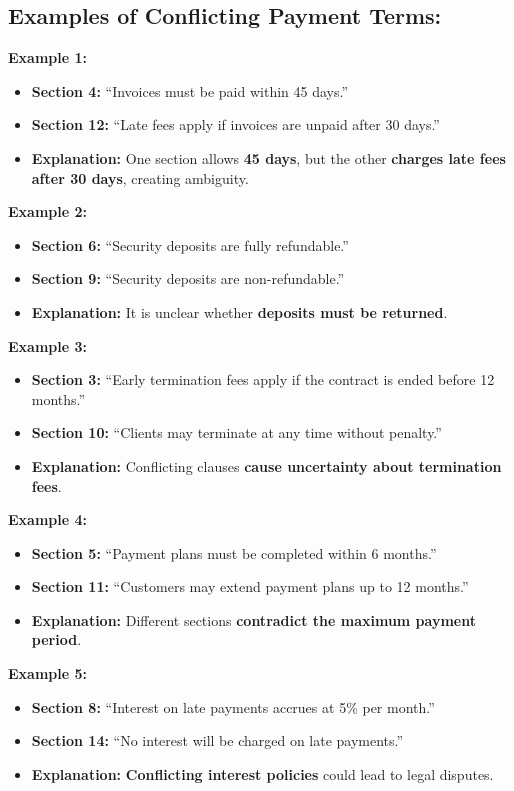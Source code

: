 \documentclass[11pt]{article}
\begin{document}
\begin{tcolorbox}[breakable,colback=lightestgray,colframe=black,title=\textbf{Inconsistency In-Text Data Generation Prompt}]
\subsection*{\textbf{Examples of Conflicting Payment Terms:}}

\textbf{Example 1:}
\begin{itemize}
    \item \textbf{Section 4:} ``Invoices must be paid within 45 days.''
    \item \textbf{Section 12:} ``Late fees apply if invoices are unpaid after 30 days.''
    \item \textbf{Explanation:} One section allows \textbf{45 days}, but the other \textbf{charges late fees after 30 days}, creating ambiguity.
\end{itemize}

\textbf{Example 2:}
\begin{itemize}
    \item \textbf{Section 6:} ``Security deposits are fully refundable.''
    \item \textbf{Section 9:} ``Security deposits are non-refundable.''
    \item \textbf{Explanation:} It is unclear whether \textbf{deposits must be returned}.
\end{itemize}

\textbf{Example 3:}
\begin{itemize}
    \item \textbf{Section 3:} ``Early termination fees apply if the contract is ended before 12 months.''
    \item \textbf{Section 10:} ``Clients may terminate at any time without penalty.''
    \item \textbf{Explanation:} Conflicting clauses \textbf{cause uncertainty about termination fees}.
\end{itemize}

\textbf{Example 4:}
\begin{itemize}
    \item \textbf{Section 5:} ``Payment plans must be completed within 6 months.''
    \item \textbf{Section 11:} ``Customers may extend payment plans up to 12 months.''
    \item \textbf{Explanation:} Different sections \textbf{contradict the maximum payment period}.
\end{itemize}

\textbf{Example 5:}
\begin{itemize}
    \item \textbf{Section 8:} ``Interest on late payments accrues at 5\% per month.''
    \item \textbf{Section 14:} ``No interest will be charged on late payments.''
    \item \textbf{Explanation:} \textbf{Conflicting interest policies} could lead to legal disputes.
\end{itemize}


\end{tcolorbox}
\end{document}
